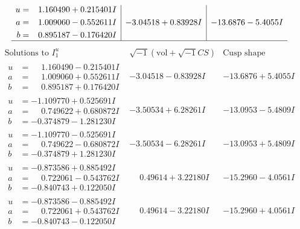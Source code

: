 \documentclass[1p]{elsarticle_modified}
\theoremstyle{definition}
\newcommand{\I}{\sqrt{-1}}
\begin{document}
$$\begin{array}{c|c|c}
\begin{aligned}
u &= \phantom{-}1.160490 + 0.215401 I \\
a &= \phantom{-}1.009060 - 0.552611 I \\
b &= \phantom{-}0.895187 - 0.176420 I\end{aligned}
 & -3.04518 + 0.83928 I & -13.6876 - 5.4055 I\\
 \hline 
 \end{array}$$\newpage$$\begin{array}{c|c|c}  
\text{Solutions to }I^u_{1}& \I (\text{vol} + \sqrt{-1}CS) & \text{Cusp shape}\\
 \hline 
\begin{aligned}
u &= \phantom{-}1.160490 - 0.215401 I \\
a &= \phantom{-}1.009060 + 0.552611 I \\
b &= \phantom{-}0.895187 + 0.176420 I\end{aligned}
 & -3.04518 - 0.83928 I & -13.6876 + 5.4055 I \\ \hline\begin{aligned}
u &= -1.109770 + 0.525691 I \\
a &= \phantom{-}0.749622 + 0.680872 I \\
b &= -0.374879 - 1.281230 I\end{aligned}
 & -3.50534 + 6.28261 I & -13.0953 - 5.4809 I \\ \hline\begin{aligned}
u &= -1.109770 - 0.525691 I \\
a &= \phantom{-}0.749622 - 0.680872 I \\
b &= -0.374879 + 1.281230 I\end{aligned}
 & -3.50534 - 6.28261 I & -13.0953 + 5.4809 I \\ \hline\begin{aligned}
u &= -0.873586 + 0.885492 I \\
a &= \phantom{-}0.722061 - 0.543762 I \\
b &= -0.840743 + 0.122050 I\end{aligned}
 & \phantom{-}0.49614 + 3.22180 I & -15.2960 - 4.0561 I \\ \hline\begin{aligned}
u &= -0.873586 - 0.885492 I \\
a &= \phantom{-}0.722061 + 0.543762 I \\
b &= -0.840743 - 0.122050 I\end{aligned}
 & \phantom{-}0.49614 - 3.22180 I & -15.2960 + 4.0561 I \\ \hline\begin{aligned}

\end{aligned}
\end{array}$$
\end{document}
